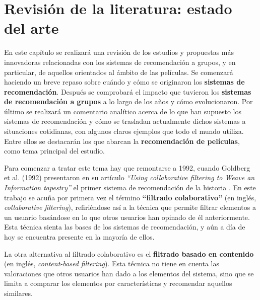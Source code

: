 \chapter{Revisión de la literatura: estado del arte}

En este capítulo se realizará una revisión de los estudios y propuestas más innovadoras relacionadas con los sistemas de recomendación a grupos, y en particular, de aquellos orientados al ámbito de las películas. Se comenzará haciendo un breve repaso sobre cuándo y cómo se originaron los \textbf{sistemas de recomendación}. Después se comprobará el impacto que tuvieron los \textbf{sistemas de recomendación a grupos} a lo largo de los años y cómo evolucionaron. Por último se realizará un comentario analítico acerca de lo que han supuesto los sistemas de recomendación y cómo se trasladan actualmente dichos sistemas a situaciones cotidianas, con algunos claros ejemplos que todo el mundo utiliza. Entre ellos se destacarán los que abarcan la \textbf{recomendación de películas}, como tema principal del estudio.

Para comenzar a tratar este tema hay que remontarse a 1992, cuando Goldberg et al. (1992) presentaron en su artículo \textit{``Using collaborative filtering to Weave an Information tapestry''} el primer sistema de recomendación de la historia \cite{tapestry-goldberg}. En este trabajo se acuña por primera vez el término \textbf{``filtrado colaborativo''} (en inglés, \textit{collaborative filtering}), refiriéndose así a la técnica que permite filtrar elementos a un usuario basándose en lo que otros usuarios han opinado de él anteriormente. Esta técnica sienta las bases de los sistemas de recomendación, y aún a día de hoy se encuentra presente en la mayoría de ellos.

La otra alternativa al filtrado colaborativo es el \textbf{filtrado basado en contenido} (en inglés, \textit{content-based filtering}). Esta técnica no tiene en cuenta las valoraciones que otros usuarios han dado a los elementos del sistema, sino que se limita a comparar los elementos por características y recomendar aquellos similares.
